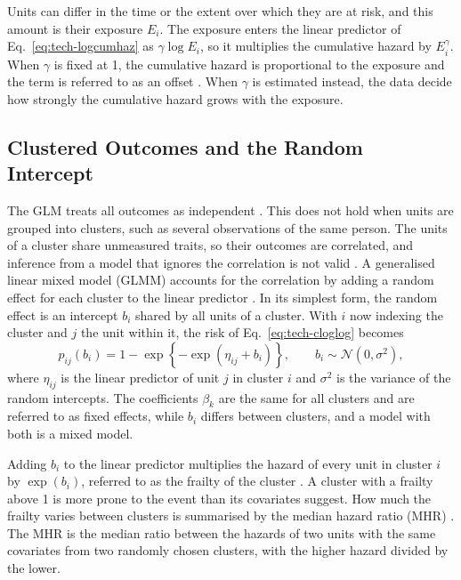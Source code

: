 Units can differ in the time or the extent over which they are at risk, and this amount is their exposure $E_i$.
The exposure enters the linear predictor of Eq.~\eqref{eq:tech-logcumhaz} as $\gamma \log E_i$, so it multiplies the cumulative hazard by $E_i^{\gamma}$.
When $\gamma$ is fixed at 1, the cumulative hazard is proportional to the exposure and the term is referred to as an offset \cite[Section~9.2, Eq.~9.3]{dobson2002glm}.
When $\gamma$ is estimated instead, the data decide how strongly the cumulative hazard grows with the exposure.

\subsection{Clustered Outcomes and the Random Intercept}
\label{sec:tech-random-intercept}

The GLM treats all outcomes as independent \cite[Section~3.4]{dobson2002glm}.
This does not hold when units are grouped into clusters, such as several observations of the same person.
The units of a cluster share unmeasured traits, so their outcomes are correlated, and inference from a model that ignores the correlation is not valid \cite[Section~11.1]{dobson2002glm}.
A generalised linear mixed model (GLMM) accounts for the correlation by adding a random effect for each cluster to the linear predictor \cite[Section~11.5]{dobson2002glm}.
In its simplest form, the random effect is an intercept $b_i$ shared by all units of a cluster.
With $i$ now indexing the cluster and $j$ the unit within it, the risk of Eq.~\eqref{eq:tech-cloglog} becomes
\begin{equation}
  p_{ij}(b_i) = 1 - \exp\!\left\{-\exp(\eta_{ij} + b_i)\right\},
  \qquad
  b_i \sim \mathcal{N}(0, \sigma^2),
  \label{eq:tech-glmm}
\end{equation}
where $\eta_{ij}$ is the linear predictor of unit $j$ in cluster $i$ and $\sigma^2$ is the variance of the random intercepts.
The coefficients $\beta_k$ are the same for all clusters and are referred to as fixed effects, while $b_i$ differs between clusters, and a model with both is a mixed model.

Adding $b_i$ to the linear predictor multiplies the hazard of every unit in cluster $i$ by $\exp(b_i)$, referred to as the frailty of the cluster \cite[Section~2.2]{austin2017mhr}.
A cluster with a frailty above 1 is more prone to the event than its covariates suggest.
How much the frailty varies between clusters is summarised by the median hazard ratio (MHR) \cite[Section~2.2]{austin2017mhr}.
The MHR is the median ratio between the hazards of two units with the same covariates from two randomly chosen clusters, with the higher hazard divided by the lower.

